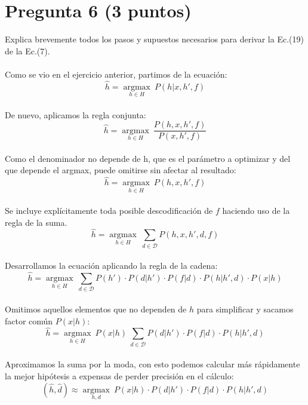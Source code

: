 \documentclass[12pt]{article}
\begin{document}
\newpage

\section*{Pregunta 6 (3 puntos)}
Explica brevemente todos los pasos y supuestos necesarios para derivar la Ec.(19) de la Ec.(7).
\\\\
Como se vio en el ejercicio anterior, partimos de la ecuación:
\begin{equation*}
    \hat{h} = \underset{h \in H}{\operatorname{argmax}} ~ P(h|x, h', f)
\end{equation*}
\\
De nuevo, aplicamos la regla conjunta:
\begin{equation*}
    \hat{h} = \underset{h \in H}{\operatorname{argmax}} ~ \frac{P(h, x, h', f)}{P(x, h', f)}
\end{equation*}
\\
Como el denominador no depende de h, que es el parámetro a optimizar y del que depende el argmax, puede omitirse sin afectar al resultado:
\begin{equation*}
    \hat{h} = \underset{h \in H}{\operatorname{argmax}} ~ P(h, x, h', f)
\end{equation*}
\\
Se incluye explícitamente toda posible descodificación de $f$ haciendo uso de la regla de la suma.
\\
\begin{equation*}
    \hat{h} = \underset{h \in H}{\operatorname{argmax}} ~ \sum_{d\in \mathcal{D} }{P(h, x, h', d, f)}
\end{equation*}
\\
Desarrollamos la ecuación aplicando la regla de la cadena:
\begin{equation*}
    \hat{h} = \underset{h \in H}{\operatorname{argmax}} ~ \sum_{d\in \mathcal{D} }{P(h') \cdot P(d|h') \cdot P(f|d) \cdot P(h|h', d) \cdot P(x|h) }
\end{equation*}
\\
Omitimos aquellos elementos que no dependen de $h$ para simplificar y sacamos factor común $P(x|h)$: 
\begin{equation*}
    \hat{h} = \underset{h \in H}{\operatorname{argmax}} ~ P(x|h) ~ \sum_{d\in \mathcal{D} }{P(d|h') \cdot P(f|d) \cdot P(h|h', d)}
\end{equation*}
\\
Aproximamos la suma por la moda, con esto podemos calcular más rápidamente la mejor hipótesis a expensas de perder precisión en el cálculo:
\begin{equation*}
    (\hat{h}, \hat{d}) \approx \underset{h, d}{\operatorname{argmax}} ~ P(x|h) \cdot {P(d|h') \cdot P(f|d) \cdot P(h|h', d)}
\end{equation*}
\end{document}
